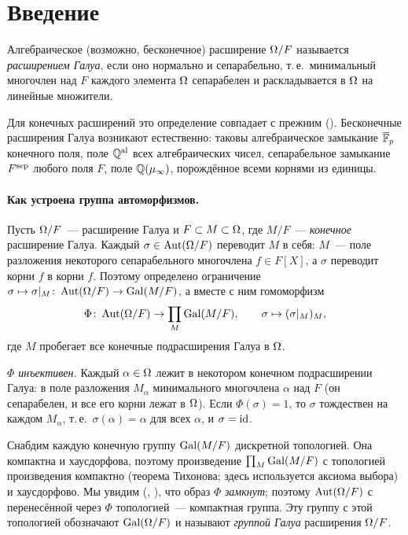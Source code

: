 \section*{Введение}

\begin{definition}
Алгебраическое (возможно, бесконечное) расширение $\Omega/F$ называется \emph{расширением Галуа}, если оно нормально и
сепарабельно, т.\,е.\ минимальный многочлен над $F$ каждого элемента $\Omega$ сепарабелен и раскладывается в $\Omega$ на
линейные множители.
\end{definition}

Для конечных расширений это определение совпадает с прежним (). Бесконечные расширения Галуа возникают
естественно: таковы алгебраическое замыкание $\overline{\mathbb F}_p$ конечного поля, поле $\mathbb Q^{\mathrm{al}}$ всех алгебраических чисел,
сепарабельное замыкание $F^{\mathrm{sep}}$ любого поля $F$, поле $\mathbb Q(\mu_\infty)$, порождённое всеми корнями из единицы.

\paragraph{Как устроена группа автоморфизмов.} Пусть $\Omega/F$~--- расширение Галуа и $F\subset M\subset\Omega$, где
$M/F$~--- \emph{конечное} расширение Галуа. Каждый $\sigma\in\operatorname{Aut}(\Omega/F)$ переводит $M$ в себя: $M$~--- поле разложения
некоторого сепарабельного многочлена $f\in F[X]$, а $\sigma$ переводит корни $f$ в корни $f$. Поэтому определено
ограничение $\sigma\mapsto\sigma|_M\colon\operatorname{Aut}(\Omega/F)\to\operatorname{Gal}(M/F)$, а вместе с ним гомоморфизм
\begin{equation}\label{eq:Phi}
\Phi\colon\operatorname{Aut}(\Omega/F)\to\prod_{M}\operatorname{Gal}(M/F),\qquad \sigma\mapsto(\sigma|_M)_M,
\end{equation}
где $M$ пробегает все конечные подрасширения Галуа в $\Omega$.

\emph{$\Phi$ инъективен.} Каждый $\alpha\in\Omega$ лежит в некотором конечном подрасширении Галуа: в поле разложения
$M_\alpha$ минимального многочлена $\alpha$ над $F$ (он сепарабелен, и все его корни лежат в $\Omega$). Если
$\Phi(\sigma)=1$, то $\sigma$ тождествен на каждом $M_\alpha$, т.\,е.\ $\sigma(\alpha)=\alpha$ для всех $\alpha$, и
$\sigma=\operatorname{id}$.

Снабдим каждую конечную группу $\operatorname{Gal}(M/F)$ дискретной топологией. Она компактна и хаусдорфова, поэтому произведение
$\prod_M\operatorname{Gal}(M/F)$ с топологией произведения компактно (теорема Тихонова; здесь используется аксиома выбора) и
хаусдорфово. Мы увидим (, ), что образ $\Phi$ \emph{замкнут}; поэтому $\operatorname{Aut}(\Omega/F)$ с перенесённой через $\Phi$
топологией~--- компактная группа. Эту группу с этой топологией обозначают $\operatorname{Gal}(\Omega/F)$ и называют \emph{группой Галуа}
расширения $\Omega/F$.

